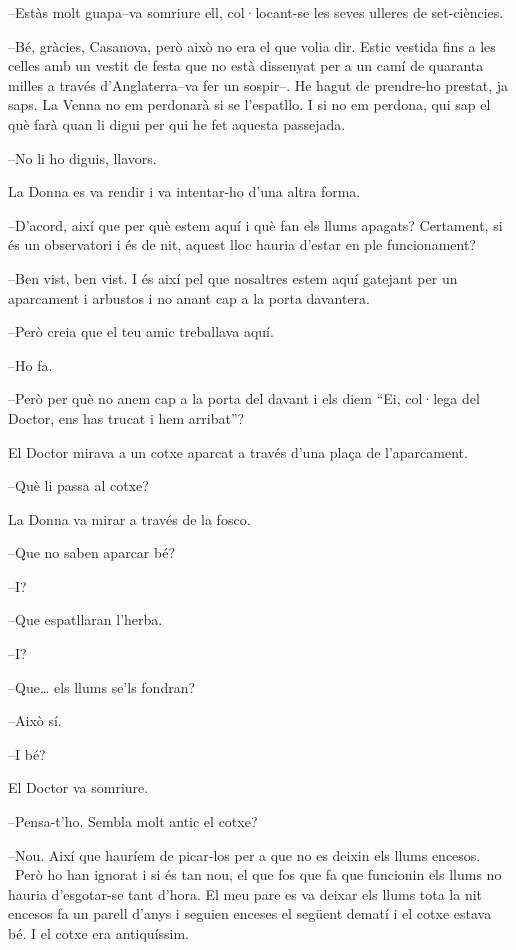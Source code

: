 --Estàs molt guapa--va somriure ell, col·locant-se les seves ulleres de
set-ciències.

--Bé, gràcies, Casanova, però això no era el que volia dir. Estic
vestida fins a les celles amb un vestit de festa que no està dissenyat
per a un camí de quaranta milles a través d'Anglaterra--va fer un
sospir--. He hagut de prendre-ho prestat, ja saps. La Venna no em
perdonarà si se l'espatllo. I si no em perdona, qui sap el què farà quan
li digui per qui he fet aquesta passejada.

--No li ho diguis, llavors.

La Donna es va rendir i va intentar-ho d'una altra forma.

--D'acord, així que per què estem aquí i què fan els llums apagats?
Certament, si és un observatori i és de nit, aquest lloc hauria d'estar
en ple funcionament?

--Ben vist, ben vist. I és així pel que nosaltres estem aquí gatejant
per un aparcament i arbustos i no anant cap a la porta davantera.

--Però creia que el teu amic treballava aquí.

--Ho fa.

--Però per què no anem cap a la porta del davant i els diem ``Ei,
col·lega del Doctor, ens has trucat i hem arribat''?

El Doctor mirava a un cotxe aparcat a través d'una plaça de
l'aparcament.

--Què li passa al cotxe?

La Donna va mirar a través de la fosco.

--Que no saben aparcar bé?

--I?

--Que espatllaran l'herba.

--I?

--Que\ldots{} els llums se'ls fondran?

--Això sí.

--I bé?

El Doctor va somriure.

--Pensa-t'ho. Sembla molt antic el cotxe?

--Nou. Així que hauríem de picar-los per a que no es deixin els llums
encesos. ~Però ho han ignorat i si és tan nou, el que fos que fa que
funcionin els llums no hauria d'esgotar-se tant d'hora. El meu pare es
va deixar els llums tota la nit encesos fa un parell d'anys i seguien
enceses el següent dematí i el cotxe estava bé. I el cotxe era
antiquíssim.

